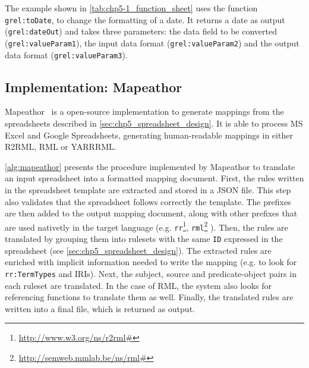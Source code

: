 The example shown in \cref{tab:chp5-1_function_sheet} uses the function \texttt{grel:toDate}, to change the formatting of a date. It returns a date as output (\texttt{grel:dateOut}) and takes three parameters: the data field to be converted (\texttt{grel:valueParam1}), the input data format (\texttt{grel:valueParam2}) and the output data format (\texttt{grel:valueParam3}).




\subsection{Implementation: Mapeathor}
\label{sec:chp5_mapeathor_tool}

Mapeathor~\parencite{iglesias-molina_2023_5973906} is a open-source implementation to generate mappings from the spreadsheets described in \cref{sec:chp5_spreadsheet_design}. It is able to process MS Excel and Google Spreadsheets, generating human-readable mappings in either R2RML, RML or YARRRML. 

\cref{alg:mapeathor} presents the procedure implemented by Mapeathor to translate an input spreadsheet into a formatted mapping document. First, the rules written in the spreadsheet template are extracted and stored in a JSON file. This step also validates that the spreadsheet follows correctly the template. The prefixes are then added to the output mapping document, along with other prefixes that are used nativetly in the target language (e.g. \texttt{rr}\footnote{\url{http://www.w3.org/ns/r2rml\#}}, \texttt{rml}\footnote{\url{http://semweb.mmlab.be/ns/rml\#}} ). Then, the rules are translated by grouping them into rulesets with the same \texttt{ID} expressed in the spreadsheet (see \cref{sec:chp5_spreadsheet_design}). The extracted rules are enriched with implicit information needed to write the mapping (e.g. to look for \texttt{rr:TermTypes} and IRIs). Next, the subject, source and predicate-object pairs in each ruleset are translated. In the case of RML, the system also looks for referencing functions to translate them as well. Finally, the translated rules are written into a final file, which is returned as output. 



